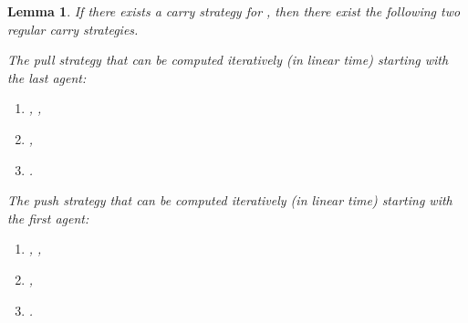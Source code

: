 \documentclass{article}
\newtheorem{lemma}{Lemma}
\newcommand\subproblem{carry\xspace}
\begin{document}
\begin{lemma}\label{lem-subproblem}
If there exists a \subproblem strategy for  , then there exist the following two regular \subproblem strategies. 

The pull strategy that can be computed iteratively (in linear time) starting with the
last agent:
\begin{enumerate}
\item , ,
\item ,
\item .
\end{enumerate}

The push strategy that can be computed iteratively (in linear time)  starting with the
first agent:
\begin{enumerate}
\item , ,
\item ,
\item .
\end{enumerate}
\end{lemma}
\end{document}
